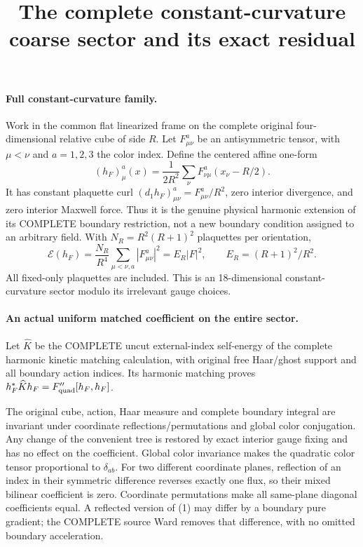 \documentclass[11pt]{article}
\title{The complete constant-curvature coarse sector and its exact residual}\author{}\date{}
\begin{document}
\maketitle
\paragraph{Full constant-curvature family.}
Work in the common flat linearized frame on the complete original
four-dimensional relative cube of side $R$. Let $F_{\mu\nu}^a$ be an
antisymmetric tensor, with $\mu<\nu$ and $a=1,2,3$ the color index.
Define the centered affine one-form
\[
 (h_F)_\mu^a(x)=\frac1{2R^2}\sum_\nu
          F_{\nu\mu}^a(x_\nu-R/2).                              \tag{1}
\]
It has constant plaquette curl
$(d_1h_F)_{\mu\nu}^a=F_{\mu\nu}^a/R^2$, zero interior divergence,
and zero interior Maxwell force. Thus it is the genuine physical
harmonic extension of its COMPLETE boundary restriction, not a new
boundary condition assigned to an arbitrary field.
With $N_R=R^2(R+1)^2$ plaquettes per orientation,
\[
 \mathcal E(h_F)=\frac{N_R}{R^4}\sum_{\mu<\nu,a}|F_{\mu\nu}^a|^2
      =E_R|F|^2,\qquad E_R=(R+1)^2/R^2.                         \tag{2}
\]
All fixed-only plaquettes are included. This is an 18-dimensional
constant-curvature sector modulo its irrelevant gauge choices.

\paragraph{An actual uniform matched coefficient on the entire sector.}
Let $\widehat K$ be the COMPLETE uncut external-index self-energy of
the complete harmonic kinetic matching calculation, with original free Haar/ghost support and all boundary
action indices. Its harmonic matching proves
$h_F^*\widehat K h_F=F_{\rm quad}''[h_F,h_F]$.

The original cube, action, Haar measure and complete boundary integral
are invariant under coordinate reflections/permutations and global color
conjugation. Any change of the convenient tree is restored by exact
interior gauge fixing and has no effect on the coefficient. Global
color invariance makes the quadratic color tensor proportional to
$\delta_{ab}$. For two different coordinate planes, reflection of an
index in their symmetric difference reverses exactly one flux, so
their mixed bilinear coefficient is zero. Coordinate permutations
make all same-plane diagonal coefficients equal.
A reflected version of (1) may differ by a boundary pure gradient;
the COMPLETE source Ward removes that difference, with no omitted
boundary acceleration.
\end{document}
